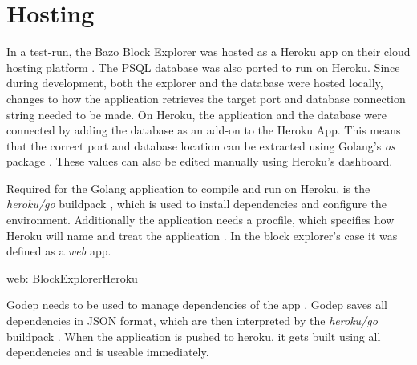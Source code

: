 \section{Hosting}
In a test-run, the Bazo Block Explorer was hosted as a Heroku app on their cloud hosting platform \cite{heroku}. The PSQL database was also ported to run on Heroku. Since during development, both the explorer and the database were hosted locally, changes to how the application retrieves the target port and database connection string needed to be made. On Heroku, the application and the database were connected by adding the database as an add-on to the Heroku App. This means that the correct port and database location can be extracted using Golang's \emph{os} package \cite{os}. These values can also be edited manually using Heroku's dashboard.

Required for the Golang application to compile and run on Heroku, is the \emph{heroku/go} buildpack \cite{buildpack}, which is used to install dependencies and configure the environment. Additionally the application needs a procfile, which specifies how Heroku will name and treat the application \cite{procfile}. In the block explorer's case it was defined as a \emph{web} app.
\begin{framed}
web: BlockExplorerHeroku
\end{framed}
Godep needs to be used to manage dependencies of the app \cite{godep}. Godep saves all dependencies in JSON \cite{json} format, which are then interpreted by the \emph{heroku/go} buildpack \cite{buildpack}. When the application is pushed to heroku, it gets built using all dependencies and is useable immediately.
